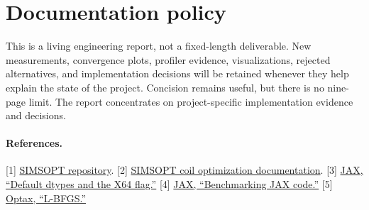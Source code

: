 \documentclass[11pt,a4paper]{article}
\begin{document}
\section{Documentation policy}

This is a living engineering report, not a fixed-length deliverable.  New
measurements, convergence plots, profiler evidence, visualizations, rejected
alternatives, and implementation decisions will be retained whenever they help
explain the state of the project.  Concision remains useful, but there is no
nine-page limit.  The report concentrates on project-specific implementation
evidence and decisions.

\paragraph{References.}

{\scriptsize
[1] \href{https://github.com/hiddenSymmetries/simsopt}{SIMSOPT repository}.
[2] \href{https://simsopt.readthedocs.io/latest/example_coils.html}{SIMSOPT coil
optimization documentation}.
[3] \href{https://docs.jax.dev/en/latest/default_dtypes.html}{JAX, ``Default
dtypes and the X64 flag.''}
[4] \href{https://docs.jax.dev/en/latest/benchmarking.html}{JAX,
``Benchmarking JAX code.''}
[5] \href{https://optax.readthedocs.io/en/latest/_collections/examples/lbfgs.html}{Optax,
``L-BFGS.''}
}
\end{document}
